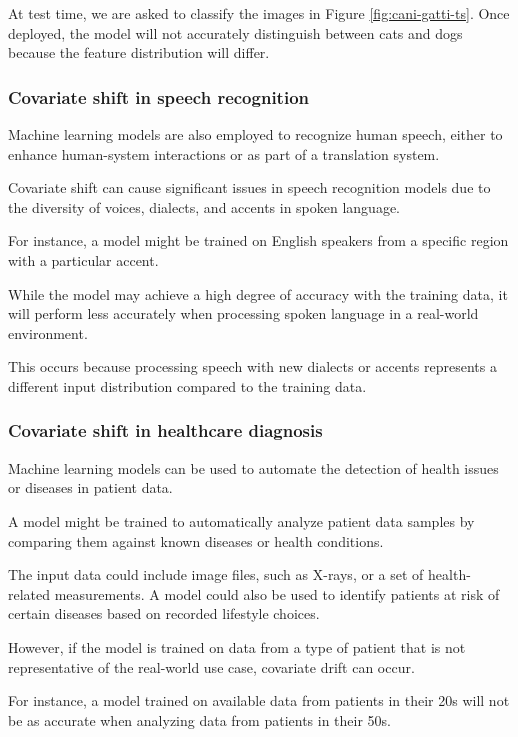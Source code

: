 At test time, we are asked to classify the images in Figure \cref{fig:cani-gatti-ts}. Once deployed, the model will not accurately distinguish between cats and dogs because the feature distribution will differ.


\subsubsection{Covariate shift in speech recognition}

Machine learning models are also employed to recognize human speech, either to enhance human-system interactions or as part of a translation system.

Covariate shift can cause significant issues in speech recognition models due to the diversity of voices, dialects, and accents in spoken language. 

For instance, a model might be trained on English speakers from a specific region with a particular accent.

While the model may achieve a high degree of accuracy with the training data, it will perform less accurately when processing spoken language in a real-world environment. 

This occurs because processing speech with new dialects or accents represents a different input distribution compared to the training data.


\subsubsection{Covariate shift in healthcare diagnosis}

Machine learning models can be used to automate the detection of health issues or diseases in patient data.

A model might be trained to automatically analyze patient data samples by comparing them against known diseases or health conditions.

The input data could include image files, such as X-rays, or a set of health-related measurements. A model could also be used to identify patients at risk of certain diseases based on recorded lifestyle choices.

However, if the model is trained on data from a type of patient that is not representative of the real-world use case, covariate drift can occur.

For instance, a model trained on available data from patients in their 20s will not be as accurate when analyzing data from patients in their 50s.


